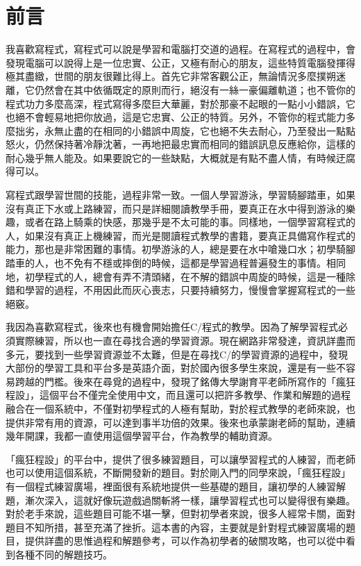 \chapter{前言}
我喜歡寫程式，寫程式可以說是學習和電腦打交道的過程。在寫程式的過程中，會發現電腦可以說得上是一位忠實、公正，又極有耐心的朋友，這些特質電腦發揮得極其盡緻，世間的朋友很難比得上。首先它非常客觀公正，無論情況多麼撲朔迷離，它仍然會在其中依循既定的原則而行，絕沒有一絲一豪偏離軌道；也不管你的程式功力多麼高深，程式寫得多麼巨大華麗，對於那豪不起眼的一點小小錯誤，它也絕不會輕易地把你放過，這是它忠實、公正的特質。另外，不管你的程式能力多麼拙劣，永無止盡的在相同的小錯誤中周旋，它也絕不失去耐心，乃至發出一點點怒火，仍然保持著冷靜沈著，一再地把最忠實而相同的錯誤訊息反應給你，這樣的耐心幾乎無人能及。如果要說它的一些缺點，大概就是有點不盡人情，有時候迂腐得可以。

寫程式跟學習世間的技能，過程非常一致。一個人學習游泳，學習騎腳踏車，如果沒有真正下水或上路練習，而只是詳細閱讀教學手冊，要真正在水中得到游泳的樂趣，或者在路上騎乘的快感，那幾乎是不太可能的事。同樣地，一個學習寫程式的人，如果沒有真正上機練習，而光是閱讀程式教學的書籍，要真正具備寫作程式的能力，那也是非常困難的事情。初學游泳的人，總是要在水中嗆幾口水；初學騎腳踏車的人，也不免有不穩或摔倒的時候，這都是學習過程普遍發生的事情。相同地，初學程式的人，總會有弄不清頭緒，在不解的錯誤中周旋的時候，這是一種除錯和學習的過程，不用因此而灰心喪志，只要持續努力，慢慢會掌握寫程式的一些絕竅。

我因為喜歡寫程式，後來也有機會開始擔任C/\cc{}程式的教學。因為了解學習程式必須實際練習，所以也一直在尋找合適的學習資源。現在網路非常發達，資訊詳盡而多元，要找到一些學習資源並不太難，但是在尋找C/\cc{}的學習資源的過程中，發現大部份的學習工具和平台多是英語介面，對於國內很多學生來說，還是有一些不容易跨越的門檻。後來在尋覓的過程中，發現了銘傳大學謝育平老師所寫作的「瘋狂程設」，這個平台不僅完全使用中文，而且還可以把許多教學、作業和解題的過程融合在一個系統中，不僅對初學程式的人極有幫助，對於程式教學的老師來說，也提供非常有用的資源，可以達到事半功倍的效果。後來也承蒙謝老師的幫助，連續幾年開課，我都一直使用這個學習平台，作為教學的輔助資源。

「瘋狂程設」的平台中，提供了很多練習題目，可以讓學習程式的人練習，而老師也可以使用這個系統，不斷開發新的題目。對於剛入門的同學來說，「瘋狂程設」有一個程式練習廣場，裡面很有系統地提供一些基礎的題目，讓初學的人練習解題，漸次深入，這就好像玩遊戲過關斬將一樣，讓學習程式也可以變得很有樂趣。對於老手來說，這些題目可能不堪一擊，但對初學者來說，很多人經常卡關，面對題目不知所措，甚至充滿了挫折。這本書的內容，主要就是針對程式練習廣場的題目，提供詳盡的思惟過程和解題參考，可以作為初學者的破關攻略，也可以從中看到各種不同的解題技巧。


